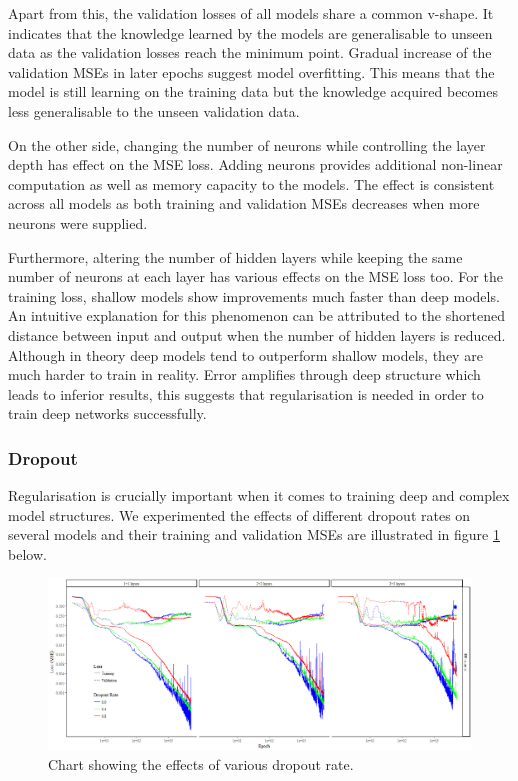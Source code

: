 \documentclass[11pt]{article} %
\theoremstyle{plain}
\theoremstyle{definition}
\begin{document}
Apart from this, the validation losses of all models share a common v-shape. It indicates that the knowledge learned by the models are generalisable to unseen data as the validation losses reach the minimum point. Gradual increase of the validation MSEs in later epochs suggest model overfitting. This means that the model is still learning on the training data but the knowledge acquired becomes less generalisable to the unseen validation data.

On the other side, changing the number of neurons while controlling the layer depth has effect on the MSE loss. Adding neurons provides additional non-linear computation as well as memory capacity to the models. The effect is consistent across all models as both training and validation MSEs decreases when more neurons were supplied.

Furthermore, altering the number of hidden layers while keeping the same number of neurons at each layer has various effects on the MSE loss too. For the training loss, shallow models show improvements much faster than deep models. An intuitive explanation for this phenomenon can be attributed to the shortened distance between input and output when the number of hidden layers is reduced. Although in theory deep models tend to outperform shallow models, they are much harder to train in reality. Error amplifies through deep structure which leads to inferior results, this suggests that regularisation is needed in order to train deep networks successfully.

\subsubsection{Dropout}

Regularisation is crucially important when it comes to training deep and complex model structures. We experimented the effects of different dropout rates on several models and their training and validation MSEs are illustrated in figure \ref{fig:dropout_chart} below.

\begin{figure}[H]
	\centering
	\includegraphics[width=1\textwidth]{dropout_chart.PNG}
	\caption{Chart showing the effects of various dropout rate.}
	\label{fig:dropout_chart}
\end{figure}
\end{document}
